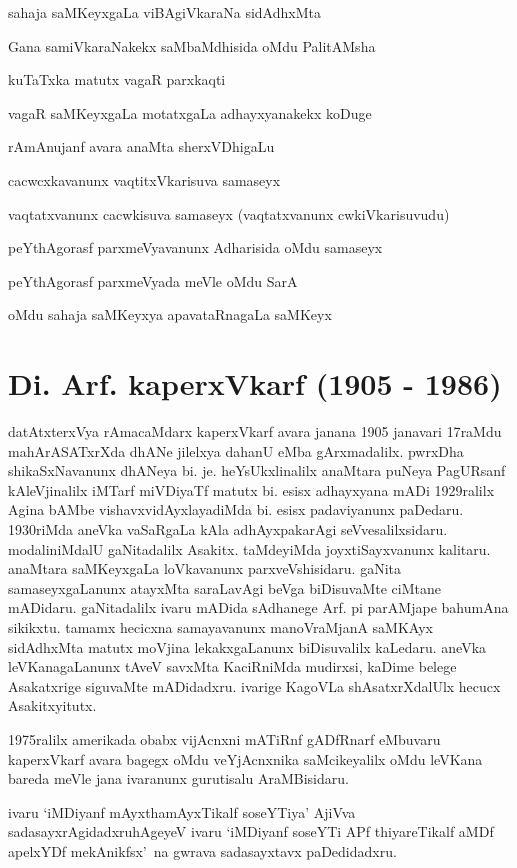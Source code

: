 sahaja saMKeyxgaLa viBAgiVkaraNa sidAdhxMta

Gana samiVkaraNakekx saMbaMdhisida oMdu PalitAMsha

kuTaTxka matutx vagaR parxkaqti

vagaR saMKeyxgaLa motatxgaLa adhayxyanakekx koDuge

rAmAnujanf avara anaMta sherxVDhigaLu

cacwcxkavanunx vaqtitxVkarisuva samaseyx

vaqtatxvanunx cacwkisuva samaseyx (vaqtatxvanunx cwkiVkarisuvudu)

peYthAgorasf parxmeVyavanunx Adharisida oMdu samaseyx

peYthAgorasf parxmeVyada meVle oMdu SarA

oMdu sahaja saMKeyxya apavataRnagaLa saMKeyx


\section{Di. Arf. kaperxVkarf  (1905 - 1986)}

\vskip -0.2cm

datAtxterxVya rAmacaMdarx kaperxVkarf avara janana {\rm 1905} janavari {\rm 17}raMdu mahArASATxrXda dhANe jilelxya dahanU eMba gArxmadalilx. pwrxDha shikaSxNavanunx dhANeya bi. je. heYsUkxli\-nalilx anaMtara puNeya PagURsanf kAleVjinalilx iMTarf miVDiyaTf matutx bi. esisx adhayxyana mADi {\rm 1929}ralilx Agina bAMbe vishavxvidAyxlayadiMda bi. esisx padaviyanunx paDedaru. {\rm 1930}riMda aneVka vaSaRgaLa kAla adhAyxpakarAgi seVvesalilxsidaru. modali\-niMdalU gaNitadalilx Asakitx. taMdeyiMda joyxtiSayxvanunx kalitaru. anaMtara saMKeyxgaLa loVkavanunx parxveVshisidaru. gaNita samaseyxgaLanunx atayxMta saraLavAgi beVga biDisuvaMte ciMtane mADidaru. gaNitadalilx ivaru mADida sAdhanege Arf. pi parAMjape bahumAna sikikxtu. tamamx hecicxna samayavanunx manoVraMjanA saMKAyx sidAdhxMta matutx moVjina lekakxgaLanunx biDisuvalilx kaLedaru. aneVka leVKanagaLanunx tAveV savxMta KaciRniMda mudirxsi, kaDime belege Asakatxrige siguvaMte mADidadxru. ivarige KagoVLa shAsatxrXdalUlx hecucx Asakitxyitutx. 

{\rm 1975}ralilx amerikada obabx vijAcnxni mATiRnf gADfRnarf eMbuvaru kaperxVkarf avara bagegx oMdu veYjAcnxnika saMcikeyalilx oMdu leVKana bareda meVle jana ivaranunx gurutisalu AraMBisidaru.

ivaru `iMDiyanf mAyxthamAyxTikalf soseYTiya' AjiVva sadasayxrAgidadxru\break hAgeyeV ivaru `iMDiyanf soseYTi APf thiyareTikalf aMDf apelxYDf mekAnikfsx'~na gwrava sadasayxtavx paDedidadxru.

